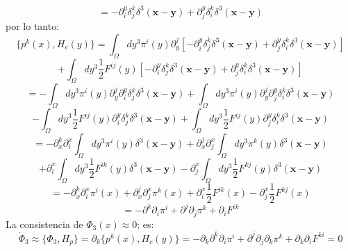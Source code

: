 \documentclass[a4paper,12pt]{article}
\begin{document}
\begin{enumerate}
$$=-\partial_i^y\delta^k_j\delta^3(\textbf{x}-\textbf{y})+\partial_j^y\delta^k_i\delta^3(\textbf{x}-\textbf{y})$$
por lo tanto:
\begin{equation}
\{p^{k}(x),H_c(y)\}=\int_{\Omega}dy^3\pi^{i}(y)\partial^j_y[-\partial_i^y\delta^k_j\delta^3(\textbf{x}-\textbf{y})+\partial_j^y\delta^k_i\delta^3(\textbf{x}-\textbf{y})]
\end{equation}
$$+\int_{\Omega}dy^3\frac{1}{2} F^{ij}(y)[-\partial_i^y\delta^k_j\delta^3(\textbf{x}-\textbf{y})+\partial_j^y\delta^k_i\delta^3(\textbf{x}-\textbf{y})]$$
$$=-\int_{\Omega}dy^3\pi^{i}(y)\partial^j_y\partial_i^y\delta^k_j\delta^3(\textbf{x}-\textbf{y})+\int_{\Omega}dy^3\pi^{i}(y)\partial^j_y\partial_j^y\delta^k_i\delta^3(\textbf{x}-\textbf{y})$$
$$-\int_{\Omega}dy^3\frac{1}{2} F^{ij}(y)\partial_i^y\delta^k_j\delta^3(\textbf{x}-\textbf{y})+\int_{\Omega}dy^3\frac{1}{2} F^{ij}(y)\partial_j^y\delta^k_i\delta^3(\textbf{x}-\textbf{y})$$
$$=-\partial^k_x\partial_i^x\int_{\Omega}dy^3\pi^{i}(y)\delta^3(\textbf{x}-\textbf{y})+\partial^j_x\partial_j^x\int_{\Omega}dy^3\pi^{k}(y)\delta^3(\textbf{x}-\textbf{y})$$
$$+\partial_i^x\int_{\Omega}dy^3\frac{1}{2} F^{ik}(y)\delta^3(\textbf{x}-\textbf{y})-\partial_j^x\int_{\Omega}dy^3\frac{1}{2} F^{kj}(y)\delta^3(\textbf{x}-\textbf{y})$$
$$=-\partial^k_x\partial_i^x\pi^{i}(x)+\partial^j_x\partial_j^x\pi^{k}(x)+\partial_i^x\frac{1}{2} F^{ik}(x)-\partial_j^x\frac{1}{2} F^{kj}(x)$$
$$=-\partial^k\partial_i\pi^{i}+\partial^j\partial_j\pi^{k}+\partial_iF^{ik}$$
La consistencia de $\Phi_3(x)\approx0$; es: 
{\small\begin{equation}
\dot{\Phi}_3\approx\{\Phi_3,H_p\}=\partial_k\{p^{k}(x),H_c(y)\}=-\partial_k\partial^k\partial_i\pi^{i}+\partial^j\partial_j\partial_k\pi^{k}+\partial_k\partial_iF^{ki}=0  
\end{equation}}
\end{enumerate}
\vspace{0,4cm}

\\
\end{document}
